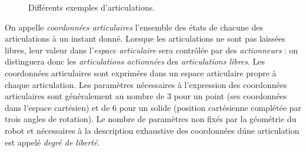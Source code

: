 \begin{figure}[!ht]
  \centering
       \hfill
     \hfill
   \hfill
    \caption{\footnotesize{Diff\'erents exemples d'articulations.}}
\label{intro:fig0}
\end{figure}

On appelle {\it coordonn\'ees articulaires} l'ensemble des \'etats de chacune des articulations \`a un instant donn\'e. Lorsque les articulations ne sont pas laiss\'ees libres, leur valeur dans l'{\it espace articulaire} sera contr\^ol\'ee par des {\it actionneurs} : on distinguera donc les {\it articulations actionn\'ees} des {\it articulations libres}. Les coordonn\'ees articulaires sont exprim\'ees dans un espace articulaire propre \`a chaque articulation. Les param\`etres n\'ecessaires \`a l'expression des coordonn\'ees articulaires sont g\'en\'eralement au nombre de 3 pour un point (ses coordonn\'ees dans l'espace cart\'esien) et de 6 pour un solide (position cart\'esienne compl\'et\'ee par trois angles de rotation). Le nombre de param\`etres non fix\'es par la g\'eom\'etrie du robot et n\'ecessaires \`a la description exhaustive des coordonn\'ees d\'une articulation est appel\'e {\it degr\'e de libert\'e}.

